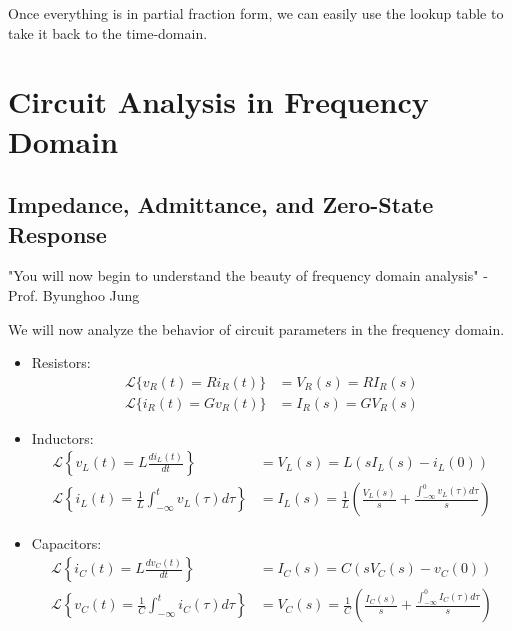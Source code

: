 \documentclass[nobib]{tufte-handout}
\begin{document}
Once everything is in partial fraction form, we can easily use the lookup table to take it back to the time-domain.
\section{Circuit Analysis in Frequency Domain}
\subsection{Impedance, Admittance, and Zero-State Response}
\begin{center}
    "You will now begin to understand the beauty of frequency domain analysis" - Prof. Byunghoo Jung
\end{center}
We will now analyze the behavior of circuit parameters in the frequency
domain.\\
\begin{itemize}
    \item Resistors:\\
          \begin{align*}
              \mathcal{L}\{v_R(t) = Ri_R(t)\} & = V_R(s) = RI_R(s) \\
              \mathcal{L}\{i_R(t) = Gv_R(t)\} & = I_R(s) = GV_R(s)
          \end{align*}
    \item Inductors:
          \begin{align*}
              \mathcal{L}\left\{ v_L(t) = L\frac{di_L(t)}{dt} \right\}                       & =V_L(s) = L(sI_L(s)-i_L(0))                                                                     \\
              \mathcal{L}\left\{i_L(t) = \frac{1}{L}\int_{-\infty}^{t}v_L(\tau)d\tau\right\} & = I_L(s) = \frac{1}{L}\left( \frac{V_L(s)}{s}+\frac{\int_{-\infty}^{0}v_L(\tau)d\tau}{s}\right)
          \end{align*}
    \item Capacitors:
          \begin{align*}
              \mathcal{L}\left\{ i_C(t) = L\frac{dv_C(t)}{dt} \right\}                       & =I_C(s) = C(sV_C(s)-v_C(0))                                                                     \\
              \mathcal{L}\left\{v_C(t) = \frac{1}{C}\int_{-\infty}^{t}i_C(\tau)d\tau\right\} & = V_C(s) = \frac{1}{C}\left( \frac{I_C(s)}{s}+\frac{\int_{-\infty}^{0}I_C(\tau)d\tau}{s}\right)
          \end{align*}
\end{itemize}
\end{document}
